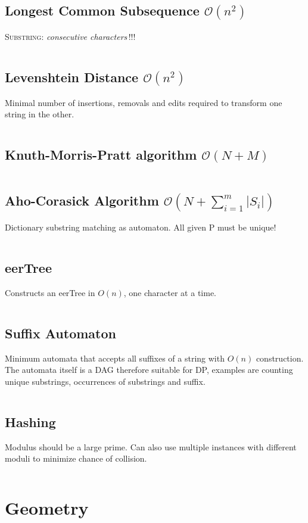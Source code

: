 \documentclass[8pt,a4paper,landscape,oneside]{amsart}
\newcommand{\mintedstyle}[2]{\inputminted[fontsize=\normalsize,baselinestretch=.9,breaklines,tabsize=2]{#1}{code/#2}}
\newcommand{\code}[1]{\mintedstyle{cpp}{#1}}
\begin{document}
\begin{multicols*}{3}
\subsection{Longest Common Subsequence $\mathcal{O}(n^{2})$}
\textsc{Substring}: \textit{consecutive characters}\,!!!
\code{strings/lcs.cpp}

\subsection{Levenshtein Distance $\mathcal{O}(n^{2})$}
Minimal number of insertions, removals and edits required to transform one string in the other.
\code{strings/edit_dist.cpp}

\subsection{Knuth-Morris-Pratt algorithm $\mathcal{O}(N + M)$}
\code{strings/kmp.cpp}

\subsection{Aho-Corasick Algorithm $\mathcal{O}(N + \sum_{i=1}^{m} |S_i|)$}
Dictionary substring matching as automaton. All given P must be unique!
\code{strings/aho_corasick.cpp}

\subsection{eerTree}
Constructs an eerTree in $O(n)$, one character at a time.
\code{strings/eertree.cpp}

\subsection{Suffix Automaton}
Minimum automata that accepts all suffixes of a string with $O(n)$
construction. The automata itself is a DAG therefore suitable for DP,
examples are counting unique substrings, occurrences of substrings and
suffix.
\code{strings/suffix_automaton.cpp}

\subsection{Hashing}
Modulus should be a large prime. Can also use multiple instances with
different moduli to minimize chance of collision.
\code{strings/hasher.cpp}

\section{Geometry}
\code{geometry/main.cpp}


\end{multicols*}
\end{document}
